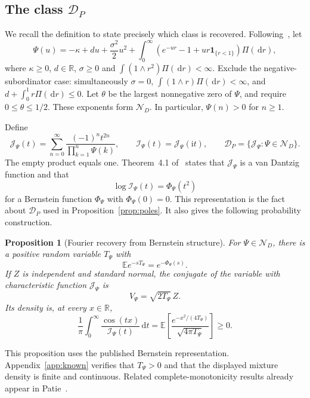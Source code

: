 \documentclass[11pt,twoside]{article}
\theoremstyle{journalplain}
\numberwithin{equation}{section}
\newtheorem{proposition}[theorem]{Proposition}
\theoremstyle{journaldefinition}
\newcommand{\R}{\mathbb R}
\newcommand{\E}{\mathbb E}
\newcommand{\DP}{\mathcal D_P}
\newcommand{\dd}{\,\mathrm d}
\newcommand{\ii}{\mathrm i}
\begin{document}
\subsection{The class \texorpdfstring{$\DP$}{D-P}}\label{subsec:DP}
We recall the definition to state precisely which class is recovered. Following\ \cite[Section 4]{KPS2024}, let
\begin{equation}\label{eq:Psi}
 \Psi(u)=-\kappa+du+\frac{\sigma^2}{2}u^2
 +\int_0^\infty(e^{-ur}-1+ur\mathbf1_{\{r<1\}})\Pi(\dd r),
\end{equation}
where $\kappa\ge0$, $d\in\R$, $\sigma\ge0$ and
$\int(1\wedge r^2)\Pi(\dd r)<\infty$. Exclude the negative-subordinator case: simultaneously $\sigma=0$, $\int(1\wedge r)\Pi(\dd r)<\infty$, and $d+\int_0^1r\Pi(\dd r)\le0$. Let $\theta$ be the largest nonnegative zero of $\Psi$, and require $0\le\theta\le1/2$. These exponents form $\mathcal N_D$. In particular, $\Psi(n)>0$ for $n\ge1$.

Define
\begin{equation}\label{eq:Jpsi}
 \mathcal J_\Psi(t)=\sum_{n=0}^\infty\frac{(-1)^nt^{2n}}{\prod_{k=1}^n\Psi(k)},
 \qquad \mathcal I_\Psi(t)=\mathcal J_\Psi(\ii t),
 \qquad \DP=\{\mathcal J_\Psi:\Psi\in\mathcal N_D\}.
\end{equation}
The empty product equals one. Theorem~4.1 of\ \cite{KPS2024} states that $\mathcal J_\Psi$ is a van Dantzig function and that
\begin{equation}\label{eq:bernstein}
 \log\mathcal I_\Psi(t)=\Phi_\Psi(t^2)
\end{equation}
for a Bernstein function $\Phi_\Psi$ with $\Phi_\Psi(0)=0$. This representation is the fact about $\DP$ used in Proposition~\ref{prop:poles}. It also gives the following probability construction.

\begin{proposition}[Fourier recovery from Bernstein structure]\label{prop:DP}
For $\Psi\in\mathcal N_D$, there is a positive random variable $T_\Psi$ with
\[
 \E e^{-sT_\Psi}=e^{-\Phi_\Psi(s)}.
\]
If $Z$ is independent and standard normal, the conjugate of the variable with characteristic function $\mathcal J_\Psi$ is
\[
 V_\Psi=\sqrt{2T_\Psi}\,Z.
\]
Its density is, at every $x\in\R$,
\begin{equation}\label{eq:mixture}
 \frac1\pi\int_0^\infty\frac{\cos(tx)}{\mathcal I_\Psi(t)}\dd t
 =\E\left[\frac{e^{-x^2/(4T_\Psi)}}{\sqrt{4\pi T_\Psi}}\right]\ge0.
\end{equation}
\end{proposition}
This proposition uses the published Bernstein representation. Appendix~\ref{app:known} verifies that $T_\Psi>0$ and that the displayed mixture density is finite and continuous. Related complete-monotonicity results already appear in Patie\ \cite{Patie2009}.
\end{document}
